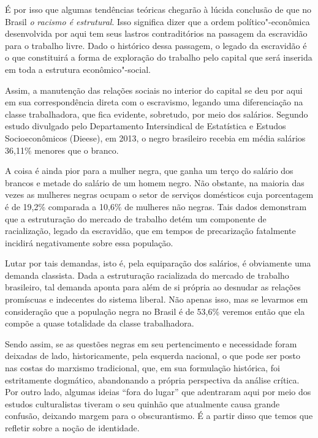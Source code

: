 É por isso que algumas tendências teóricas chegarão à lúcida conclusão
de que no Brasil \emph{o} \emph{racismo é estrutural}. Isso significa
dizer que a ordem político"-econômica desenvolvida por aqui tem seus
lastros contraditórios na passagem da escravidão para o trabalho livre.
Dado o histórico dessa passagem, o legado da escravidão é o que
constituirá a forma de exploração do trabalho pelo capital que será
inserida em toda a estrutura econômico"-social.

Assim, a manutenção das relações sociais no interior do capital se deu
por aqui em sua correspondência direta com o escravismo, legando uma
diferenciação na classe trabalhadora, que fica evidente, sobretudo, por
meio dos salários. Segundo estudo divulgado pelo Departamento
Intersindical de Estatística e Estudos Socioeconômicos (Dieese), em
2013, o negro brasileiro recebia em média salários 36,11\% menores que o
branco.

A coisa é ainda pior para a mulher negra, que ganha um terço do salário
dos brancos e metade do salário de um homem negro. Não obstante, na
maioria das vezes as mulheres negras ocupam o setor de serviços
domésticos cuja porcentagem é de 19,2\% comparada a 10,6\% de mulheres
não negras. Tais dados demonstram que a estruturação do mercado de
trabalho detém um componente de racialização, legado da escravidão, que
em tempos de precarização fatalmente incidirá negativamente sobre essa
população.

Lutar por tais demandas, isto é, pela equiparação dos salários, é
obviamente uma demanda classista. Dada a estruturação racializada do
mercado de trabalho brasileiro, tal demanda aponta para além de si
própria ao desnudar as relações promíscuas e indecentes do sistema
liberal. Não apenas isso, mas se levarmos em consideração que a
população negra no Brasil é de 53,6\% veremos então que ela compõe a
quase totalidade da classe trabalhadora.

Sendo assim, se as questões negras em seu pertencimento e necessidade
foram deixadas de lado, historicamente, pela esquerda nacional, o que
pode ser posto nas costas do marxismo tradicional, que, em sua
formulação histórica, foi estritamente dogmático, abandonando a própria
perspectiva da análise crítica. Por outro lado, algumas ideias ``fora do
lugar'' que adentraram aqui por meio dos estudos culturalistas tiveram o
seu quinhão que atualmente causa grande confusão, deixando margem para o
obscurantismo. É a partir disso que temos que refletir sobre a noção de
identidade.

